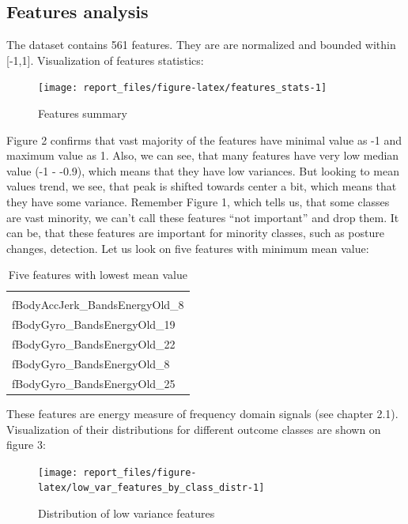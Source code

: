 \documentclass[
]{article}
\begin{document}
\hypertarget{features-analysis}{%
\subsection{Features analysis}\label{features-analysis}}

The dataset contains 561 features. They are are normalized and bounded
within {[}-1,1{]}. Visualization of features statistics:

\begin{figure}

{\centering \texttt{[image: report\_files/figure-latex/features\_stats-1]} 

}

\caption{Features summary}\label{fig:features_stats}
\end{figure}

Figure 2 confirms that vast majority of the features have minimal value
as -1 and maximum value as 1. Also, we can see, that many features have
very low median value (-1 - -0.9), which means that they have low
variances. But looking to mean values trend, we see, that peak is
shifted towards center a bit, which means that they have some variance.
Remember Figure 1, which tells us, that some classes are vast minority,
we can't call these features ``not important'' and drop them. It can be,
that these features are important for minority classes, such as posture
changes, detection. Let us look on five features with minimum mean
value:

\begin{longtable}[]{@{}l@{}}
\caption{Five features with lowest mean value}\tabularnewline
\toprule
 \\
\midrule
\endfirsthead
\toprule
 \\
\midrule
\endhead
fBodyAccJerk\_BandsEnergyOld\_8 \\
fBodyGyro\_BandsEnergyOld\_19 \\
fBodyGyro\_BandsEnergyOld\_22 \\
fBodyGyro\_BandsEnergyOld\_8 \\
fBodyGyro\_BandsEnergyOld\_25 \\
\bottomrule
\end{longtable}

These features are energy measure of frequency domain signals (see
chapter 2.1). Visualization of their distributions for different outcome
classes are shown on figure 3:

\begin{figure}

{\centering \texttt{[image: report\_files/figure-latex/low\_var\_features\_by\_class\_distr-1]} 

}

\caption{Distribution of low variance features}\label{fig:low_var_features_by_class_distr}
\end{figure}
\end{document}
